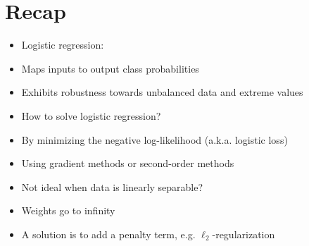 \documentclass[10pt]{article}
\begin{document}
\section*{Recap}
\begin{itemize}
  \item Logistic regression:

  \item Maps inputs to output class probabilities

  \item Exhibits robustness towards unbalanced data and extreme values

  \item How to solve logistic regression?

  \item By minimizing the negative log-likelihood (a.k.a. logistic loss)

  \item Using gradient methods or second-order methods

  \item Not ideal when data is linearly separable?

  \item Weights go to infinity

  \item A solution is to add a penalty term, e.g. $\ell_{2}$-regularization

\end{itemize}
\end{document}
